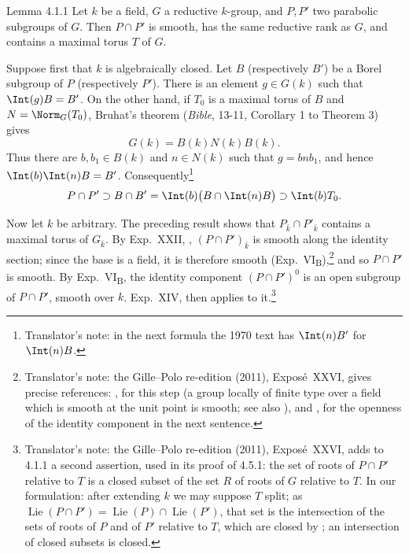 

\begin{sgastatement}{Lemma 4.1.1}
Let \(k\) be a field, \(G\) a reductive \(k\)-group, and \(P,P'\) two
parabolic subgroups of \(G\).  Then \(P\cap P'\) is smooth, has the same
reductive rank as \(G\), and contains a maximal torus \(T\) of \(G\).
\end{sgastatement}

\SGAProof
Suppose first that \(k\) is algebraically closed.  Let \(B\) (respectively
\(B'\)) be a Borel subgroup of \(P\) (respectively \(P'\)).  There is an
element \(g\in G(k)\) such that \(\Int(g)B=B'\).  On the other hand, if
\(T_0\) is a maximal torus of \(B\) and \(N=\Norm_G(T_0)\), Bruhat's
theorem (\emph{Bible}, 13-11, Corollary 1 to Theorem 3) gives
\[
 G(k)=B(k)N(k)B(k).
\]
Thus there are \(b,b_1\in B(k)\) and \(n\in N(k)\) such that
\(g=bnb_1\), and hence
\(\Int(b)\Int(n)B=B'\).  Consequently\footnote{Translator's note: in the next formula the 1970 text has
\(\Int(n)B'\) for \(\Int(n)B\).}
\[
 P\cap P'\supset B\cap B'
  =\Int(b)\bigl(B\cap\Int(n)B\bigr)
  \supset\Int(b)T_0.
\]

Now let \(k\) be arbitrary.  The preceding result shows that
\(P_{\bar k}\cap P'_{\bar k}\) contains a maximal torus of
\(G_{\bar k}\).  By Exp.\ XXII, ,
\((P\cap P')_{\bar k}\) is smooth along the identity section; since the
base is a field, it is therefore smooth (Exp.\ VI\textsubscript{B}),\footnote{Translator's note: the Gille--Polo re-edition (2011), Exposé~XXVI, gives
precise references: , for this step (a group locally of
finite type over a field which is smooth at the unit point is smooth; see
also ), and , for the openness of
the identity component in the next sentence.} and so
\(P\cap P'\) is smooth.  By Exp.\ VI\textsubscript{B}, the identity component
\((P\cap P')^0\) is an open subgroup of \(P\cap P'\), smooth over \(k\).
Exp.\ XIV,  then applies to it.\footnote{Translator's note: the Gille--Polo re-edition (2011), Exposé~XXVI, adds to
4.1.1 a second assertion, used in its proof of 4.5.1: the set of roots of
\(P\cap P'\) relative to \(T\) is a closed subset of the set \(R\) of roots
of \(G\) relative to \(T\). In our formulation: after extending \(k\) we may
suppose \(T\) split; as \(\operatorname{Lie}(P\cap P')=\operatorname{Lie}(P)\cap\operatorname{Lie}(P')\),
that set is the intersection of the sets of roots of \(P\) and of \(P'\)
relative to \(T\), which are closed by ; an intersection of closed
subsets is closed.}
\SGAQED

